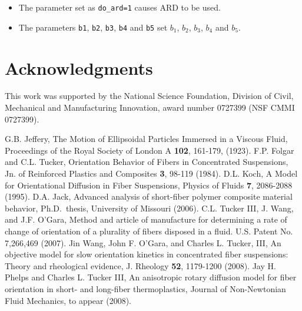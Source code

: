 \documentclass{amsart}
\begin{document}
\begin{itemize}
\item The parameter set as {\tt do\_ard=1} causes ARD to be used.
\item The parameters {\tt b1}, {\tt b2}, {\tt b3}, {\tt b4} and {\tt b5} set $b_1$, $b_2$, $b_3$, $b_4$ and $b_5$.
\end{itemize}

\section*{Acknowledgments}

\noindent
This work was supported by the National Science Foundation, Division of Civil, Mechanical and Manufacturing Innovation, award number 0727399 (NSF CMMI 0727399).

\begin{thebibliography}{99}
G.B. Jeffery, The Motion of Ellipsoidal Particles Immersed in a Viscous Fluid, Proceedings of the Royal Society of London A {\bf 102}, 161-179, (1923).
F.P. Folgar and C.L. Tucker, Orientation Behavior of Fibers in Concentrated Suspensions, Jn. of Reinforced Plastics and Composites {\bf 3}, 98-119 (1984).
D.L. Koch, A Model for Orientational Diffusion in Fiber Suspensions, Physics of Fluids {\bf 7}, 2086-2088 (1995).
D.A. Jack, Advanced analysis of short-fiber polymer composite material behavior, Ph.D.\ thesis, University of Missouri (2006).
C.L. Tucker III, J. Wang, and J.F. O'Gara, Method and article of manufacture for determining a rate of change of orientation of a plurality of fibers disposed in a fluid. U.S. Patent No. 7,266,469 (2007).
Jin Wang, John F. O'Gara, and Charles L. Tucker, III, An objective model for slow orientation kinetics in concentrated fiber suspensions: Theory and rheological evidence, J. Rheology {\bf 52}, 1179-1200 (2008).
Jay H. Phelps and Charles L. Tucker III, An anisotropic rotary diffusion model for fiber orientation in short- and long-fiber thermoplastics, Journal of Non-Newtonian Fluid Mechanics, to appear (2008).
\end{thebibliography}
\end{document}

